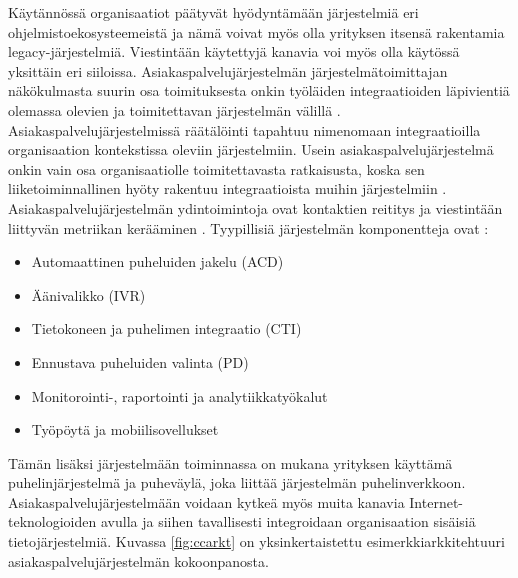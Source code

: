 \documentclass[finnish,12pt,a4paper,pdftex]{article}
\begin{document}
\noindent Käytännössä organisaatiot päätyvät hyödyntämään järjestelmiä eri ohjelmistoekosysteemeistä ja nämä voivat myös olla yrityksen itsensä rakentamia legacy-järjestelmiä. Viestintään käytettyjä kanavia voi myös olla käytössä yksittäin eri siiloissa. Asiakaspalvelujärjestelmän järjestelmätoimittajan näkökulmasta suurin osa toimituksesta onkin työläiden integraatioiden läpivientiä olemassa olevien ja toimitettavan järjestelmän välillä \citep{vcc, ccinfo}. Asiakaspalvelujärjestelmissä räätälöinti tapahtuu nimenomaan integraatioilla organisaation kontekstissa oleviin järjestelmiin. Usein asiakaspalvelujärjestelmä onkin vain osa organisaatiolle toimitettavasta ratkaisusta, koska sen liiketoiminnallinen hyöty rakentuu integraatioista muihin järjestelmiin \citep{bernier}.\\

Asiakaspalvelujärjestelmän ydintoimintoja ovat kontaktien reititys ja viestintään liittyvän metriikan kerääminen \citep{vcc}. Tyypillisiä järjestelmän komponentteja ovat \citep{bernier}:

\begin{itemize}
\setlength{\itemsep}{0pt}
    \item Automaattinen puheluiden jakelu (ACD)
    \item Äänivalikko (IVR)
    \item Tietokoneen ja puhelimen integraatio (CTI)
    \item Ennustava puheluiden valinta (PD)
    \item Monitorointi-, raportointi ja analytiikkatyökalut
    \item Työpöytä ja mobiilisovellukset
\end{itemize}

\noindent Tämän lisäksi järjestelmään toiminnassa on mukana yrityksen käyttämä puhelinjärjestelmä ja puheväylä, joka liittää järjestelmän puhelinverkkoon. Asiakaspalvelujärjestelmään voidaan kytkeä myös muita kanavia Internet-teknologioiden avulla ja siihen tavallisesti integroidaan organisaation sisäisiä tietojärjestelmiä. Kuvassa \ref{fig:ccarkt} on yksinkertaistettu esimerkkiarkkitehtuuri asiakaspalvelujärjestelmän kokoonpanosta. 
\end{document}
